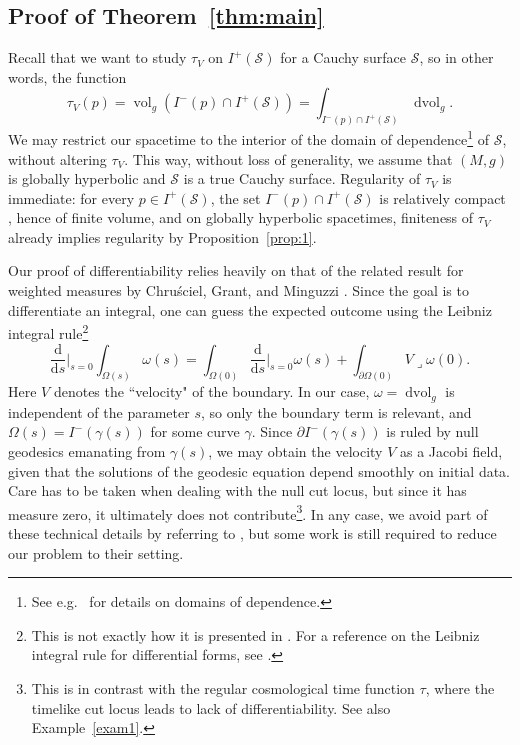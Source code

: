 \documentclass[a4paper,11pt]{amsart}
\newcommand{\dd}{\mathrm{d}}
\newcommand{\vol}{\operatorname{dvol}_g}
\newcommand{\Vol}{\operatorname{vol}_g}
\newcommand{\CS}{\mathcal{S}}
\begin{document}
\subsection{Proof of Theorem~\ref{thm:main}}

Recall that we want to study $\tau_V$ on $I^+(\CS)$ for a Cauchy surface $\CS$, so in other words, the function
\begin{equation*}
    \tau_V(p) = \Vol(I^-(p) \cap I^+(\CS)) = \int_{I^-(p) \cap I^+(\CS)} \vol.
\end{equation*}
We may restrict our spacetime to the interior of the domain of dependence\footnote{See e.g.\ \cite[Chap.~6]{HaEl73} for details on domains of dependence.} of $\CS$, without altering $\tau_V$. This way, without loss of generality, we assume that $(M,g)$ is globally hyperbolic and $\CS$ is a true Cauchy surface.  Regularity of $\tau_V$ is immediate: for every $p \in I^+(\CS)$, the set $I^-(p) \cap I^+(\CS)$ is relatively compact \cite[Prop.~8]{Ger70}, hence of finite volume, and on globally hyperbolic spacetimes, finiteness of $\tau_V$ already implies regularity by Proposition~\ref{prop:1}.

Our proof of differentiability relies heavily on that of the related result for weighted measures by Chruściel, Grant, and Minguzzi \cite{CGM16}. Since the goal is to differentiate an integral, one can guess the expected outcome using the Leibniz integral rule\footnote{This is not exactly how it is presented in \cite{CGM16}. For a reference on the Leibniz integral rule for differential forms, see \cite{Fla73}.}
\begin{equation*}
    \frac{\dd }{\dd s} \biggr\vert_{s=0} \int_{\Omega(s)} \omega(s) = \int_{\Omega(0)} \frac{\dd }{\dd s} \biggr\vert_{s=0} \omega(s) + \int_{\partial \Omega (0)} V \lrcorner \omega(0).
\end{equation*}
Here $V$ denotes the ``velocity" of the boundary. In our case, $\omega = \vol$ is independent of the parameter $s$, so only the boundary term is relevant, and $\Omega(s) = I^-(\gamma(s))$ for some curve $\gamma$. Since $\partial I^-(\gamma(s))$ is ruled by null geodesics emanating from $\gamma(s)$, we may obtain the velocity $V$ as a Jacobi field, given that the solutions of the geodesic equation depend smoothly on initial data. Care has to be taken when dealing with the null cut locus, but since it has measure zero, it ultimately does not contribute\footnote{This is in contrast with the regular cosmological time function $\tau$, where the timelike cut locus leads to lack of differentiability. See also Example~\ref{exam1}.}. In any case, we avoid part of these technical details by referring to \cite{CGM16}, but some work is still required to reduce our problem to their setting.
\end{document}
